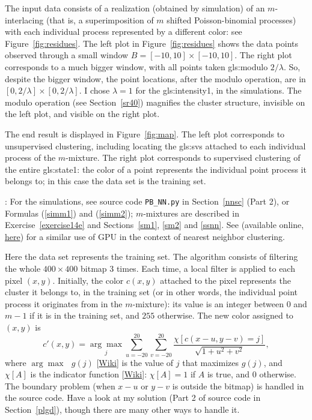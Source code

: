 \documentclass[10pt]{article}
\begin{document}
The input data consists of a realization (obtained by simulation) of an 
\textcolor{index}{$m$-interlacing} (that is, a superimposition of $m$ shifted Poisson-binomial processes) with each individual process represented by a different color: see Figure~\ref{fig:residues}. The left plot in Figure~\ref{fig:residues} shows the data points observed through a small window $B=[-10,10]\times[-10,10]$. The right plot corresponds to a much bigger window, with all points taken \gls{gls:modulo} $2/\lambda$. So, despite the bigger window, the point locations, after the modulo operation, are in $[0, 2/\lambda]\times[0, 2/\lambda]$. I chose $\lambda=1$ for the 
\gls{gls:intensity1}, in the simulations. The modulo operation (see Section~\ref{sr40}) magnifies the cluster structure, invisible on the left plot, and visible on the right plot.  

The end result is displayed in Figure~\ref{fig:map}. The left plot corresponds to unsupervised clustering, including locating the 
\glspl{gls:sv} attached to each 
individual process of the $m$-mixture. The right plot corresponds to supervised clustering of the entire \gls{gls:state1}:  the color of a point represents the individual point process it belongs to; in this case the data set is the training set. 

: For the simulations, see source code \texttt{PB\_NN.py} in Section~\ref{nnsc} (Part 2), or Formulas (\ref{simm1}) and (\ref{simm2}); $m$-mixtures are described in Exercise~\ref{exercise14e} and Sections~\ref{sm1}, \ref{sm2} and \ref{ssnn}. See \cite{vgar} (available online, \href{https://arxiv.org/abs/0804.1448}{here}) for a similar use of GPU in the context of nearest neighbor clustering. \\


\noindent Here the data set represents the training set. The algorithm consists of filtering the whole $400\times 400$ bitmap 3 times. Each time, a local filter is applied 
to each pixel $(x,y)$. Initially, the color $c(x,y)$ attached to the pixel represents the cluster it belongs to, in the training set (or in other words, the individual point process it originates from in the $m$-mixture): its value
is an integer between $0$ and $m-1$ if it is in the training set, and $255$ otherwise.  The new color assigned to $(x,y)$ is
\begin{equation}
c'(x,y)=\underset{j}{\arg \max} \sum_{u=-20}^{20}\sum_{v=-20}^{20}\frac{\chi[c(x-u,y-v)=j]}{\sqrt{1+u^2+v^2}}, \label{filt786}
\end{equation}
where $\arg \max \mbox{ } g(j)$ [\href{https://en.wikipedia.org/wiki/Arg_max}{Wiki}] is the value of $j$ that maximizes $g(j)$, 
and $\chi[A]$ is the indicator function [\href{https://en.wikipedia.org/wiki/Indicator_function}{Wiki}]: $\chi[A]=1$ if $A$ is true, and $0$ otherwise.
The boundary problem (when $x-u$ or $y-v$ is outside the bitmap) is handled in the source code. Have a look at my solution (Part 2 of source code
in Section~\ref{plgd}), though there are many other ways
to handle it. 
\end{document}

